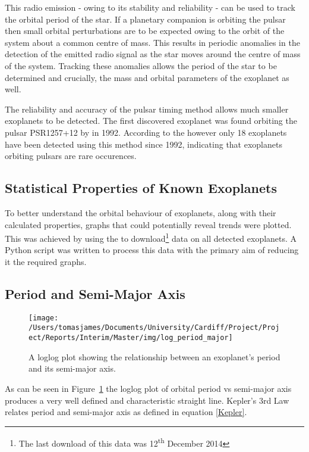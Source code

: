 \documentclass[twoside,4pt]{article}
\begin{document}
\begin{multicols}{2}
This radio emission - owing to its stability and reliability - can be used to track the orbital period of the star. If a planetary companion is orbiting the pulsar then small orbital perturbations are to be expected owing to the orbit of the system about a common centre of mass. This results in periodic anomalies in the detection of the emitted radio signal as the star moves around the centre of mass of the system. Tracking these anomalies allows the period of the star to be determined and crucially, the mass and orbital parameters of the exoplanet as well.

The reliability and accuracy of the pulsar timing method allows much smaller exoplanets to be detected. The first discovered exoplanet was found orbiting the pulsar PSR1257+12 by \citeauthor{first} in 1992. According to the \textcite{exo} however only 18 exoplanets have been detected using this method since 1992, indicating that exoplanets orbiting pulsars are rare occurences.


\subsection{Statistical Properties of Known Exoplanets}
To better understand the orbital behaviour of exoplanets, along with their calculated properties, graphs that could potentially reveal trends were plotted. This was achieved by using the \textcite{exo} to download\footnote{The last download of this data was 12\textsuperscript{th} December 2014} data on all detected exoplanets. A Python script was written to process this data with the primary aim of reducing it the required graphs.

\subsection*{Period and Semi-Major Axis}
\begin{figure}[H]
\centering
    \texttt{[image: /Users/tomasjames/Documents/University/Cardiff/Project/Project/Reports/Interim/Master/img/log\_period\_major]}
\caption{A loglog plot showing the relationship between an exoplanet's period and its semi-major axis.}\label{log_period_major}
\end{figure}

As can be seen in Figure~\ref{log_period_major} the loglog plot of orbital period vs semi-major axis produces a very well defined and characteristic straight line. Kepler's 3rd Law relates period and semi-major axis as defined in equation \ref{Kepler}.


\end{multicols}
\end{document}
